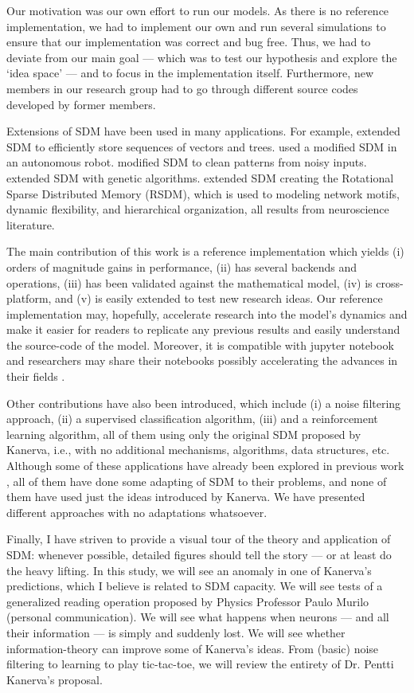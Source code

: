Our motivation was our own effort to run our models. As there is no reference implementation, we had to implement our own and run several simulations to ensure that our implementation was correct and bug free. Thus, we had to deviate from our main goal --- which was to test our hypothesis and explore the `idea space' --- and to focus in the implementation itself. Furthermore, new members in our research group had to go through different source codes developed by former members.

Extensions of SDM have been used in many applications. For example, \citet{Snaider2011} extended SDM to efficiently store sequences of vectors and trees.  \citet{Rajesh1998} used a modified SDM in an autonomous robot. \citet{Meng2009} modified SDM to clean patterns from noisy inputs. \citet{fan1997genetic} extended SDM with genetic algorithms. \citet{chada2016you} extended SDM creating the Rotational Sparse Distributed Memory (RSDM), which is used to modeling network motifs, dynamic flexibility, and hierarchical organization, all results from neuroscience literature.

The main contribution of this work is a reference implementation which yields (i) orders of magnitude gains in performance, (ii) has several backends and operations, (iii) has been validated against the mathematical model, (iv) is cross-platform, and (v) is easily extended to test new research ideas. Our reference implementation may, hopefully, accelerate research into the model's dynamics and make it easier for readers to replicate any previous results and easily understand the source-code of the model.  Moreover, it is compatible with jupyter notebook and researchers may share their notebooks possibly accelerating the advances in their fields \citep{shen2014interactive}.

Other contributions have also been introduced, which include (i) a noise filtering approach, (ii) a supervised classification algorithm, (iii) and a reinforcement learning algorithm, all of them using only the original SDM proposed by Kanerva, i.e., with no additional mechanisms, algorithms, data structures, etc. Although some of these applications have already been explored in previous work \citep{Meng2009, fan1997genetic, rao1995natural}, all of them have done some adapting of SDM to their problems, and none of them have used just the ideas introduced by Kanerva. We have presented different approaches with no adaptations whatsoever.

Finally, I have striven to provide a visual tour of the theory and application of SDM: whenever possible, detailed figures should tell the story --- or at least do the heavy lifting. In this study, we will see an anomaly in one of Kanerva's predictions, which I believe is related to SDM capacity. We will see tests of a generalized reading operation proposed by Physics Professor Paulo Murilo (personal communication).  We will see what happens when neurons --- and
all their information --- is simply and suddenly lost.  We will see whether information-theory can improve some of Kanerva's ideas.  From (basic) noise filtering to learning to play tic-tac-toe, we will review the entirety of Dr. Pentti Kanerva's proposal.

